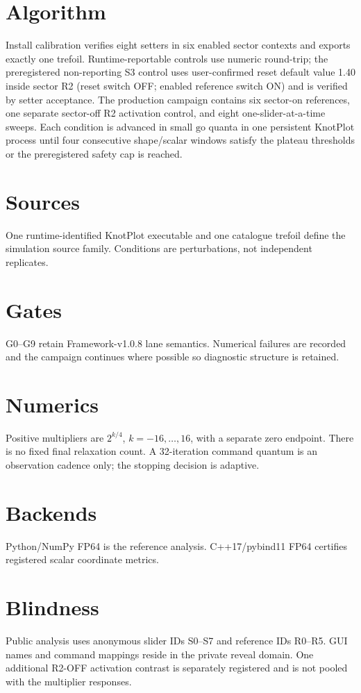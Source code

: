\documentclass[11pt,a4paper]{article}
\begin{document}
\section{Algorithm}
Install calibration verifies eight setters in six enabled sector contexts and exports exactly one trefoil. Runtime-reportable controls use numeric round-trip; the preregistered non-reporting S3 control uses user-confirmed reset default value 1.40 inside sector R2 (reset switch OFF; enabled reference switch ON) and is verified by setter acceptance. The production campaign contains six sector-on references, one separate sector-off R2 activation control, and eight one-slider-at-a-time sweeps. Each condition is advanced in small $\mathrm{go}$ quanta in one persistent KnotPlot process until four consecutive shape/scalar windows satisfy the plateau thresholds or the preregistered safety cap is reached.
\section{Sources}
One runtime-identified KnotPlot executable and one catalogue trefoil define the simulation source family. Conditions are perturbations, not independent replicates.
\section{Gates}
G0--G9 retain Framework-v1.0.8 lane semantics. Numerical failures are recorded and the campaign continues where possible so diagnostic structure is retained.
\section{Numerics}
Positive multipliers are $2^{k/4}$, $k=-16,\ldots,16$, with a separate zero endpoint. There is no fixed final relaxation count. A 32-iteration command quantum is an observation cadence only; the stopping decision is adaptive.
\section{Backends}
Python/NumPy FP64 is the reference analysis. C++17/pybind11 FP64 certifies registered scalar coordinate metrics.
\section{Blindness}
Public analysis uses anonymous slider IDs S0--S7 and reference IDs R0--R5. GUI names and command mappings reside in the private reveal domain. One additional R2-OFF activation contrast is separately registered and is not pooled with the multiplier responses.
\end{document}
